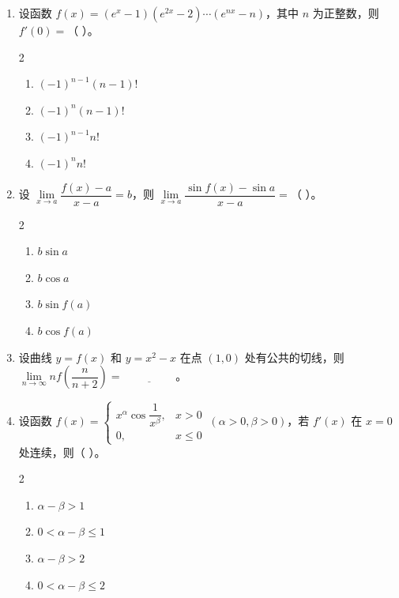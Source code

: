 \begin{enumerate}[label=\textbf{\arabic*.}, itemsep=4.7cm]
\newpage

    \item 设函数 $f(x) = (e^x - 1)(e^{2x} - 2) \cdots (e^{nx} - n)$，其中 $n$ 为正整数，则 $f'(0) = $（ \quad ）。
    \begin{multicols}{2}
        \begin{enumerate}[label=(\Alph*)]
            \item $(-1)^{n-1}(n-1)!$
            \item $(-1)^n(n-1)!$
            \item $(-1)^{n-1}n!$
            \item $(-1)^n n!$
        \end{enumerate}
    \end{multicols}

    \item 设 $\lim\limits_{x \to a} \dfrac{f(x) - a}{x - a} = b$，则 $\lim\limits_{x \to a} \dfrac{\sin f(x) - \sin a}{x - a} = $（ \quad ）。
    \begin{multicols}{2}
        \begin{enumerate}[label=(\Alph*)]
            \item $b \sin a$
            \item $b \cos a$
            \item $b \sin f(a)$
            \item $b \cos f(a)$
        \end{enumerate}
    \end{multicols}

    \item 设曲线 $y = f(x)$ 和 $y = x^2 - x$ 在点 $(1, 0)$ 处有公共的切线，则 $\lim\limits_{n \to \infty} n f\left( \dfrac{n}{n+2} \right) = \underline{\hspace{2cm}}$。

    \item 设函数 $f(x) = \begin{cases} x^\alpha \cos \dfrac{1}{x^\beta}, & x > 0 \\ 0, & x \le 0 \end{cases} \ (\alpha > 0, \beta > 0)$，若 $f'(x)$ 在 $x=0$ 处连续，则（ \quad ）。
    \begin{multicols}{2}
        \begin{enumerate}[label=(\Alph*)]
            \item $\alpha - \beta > 1$
            \item $0 < \alpha - \beta \le 1$
            \item $\alpha - \beta > 2$
            \item $0 < \alpha - \beta \le 2$
        \end{enumerate}
    \end{multicols}


\end{enumerate}
